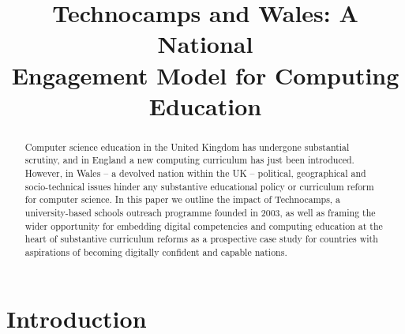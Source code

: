 \documentclass[conference]{IEEEtran}
\begin{document}
%
\title{Technocamps and Wales: A National \\ 
       Engagement Model for Computing Education}







\maketitle

\begin{abstract}
Computer science education in the United Kingdom has undergone
substantial scrutiny, and in England a new computing curriculum has
just been introduced.  However, in Wales -- a devolved nation within
the UK -- political, geographical and socio-technical issues hinder
any substantive educational policy or curriculum reform for computer
science.  In this paper we outline the impact of Technocamps, a
university-based schools outreach programme founded in 2003, as well
as framing the wider opportunity for embedding digital competencies
and computing education at the heart of substantive curriculum reforms
as a prospective case study for countries with aspirations of becoming
digitally confident and capable nations.
\end{abstract}


\section{Introduction}\label{intro}

\end{document}
